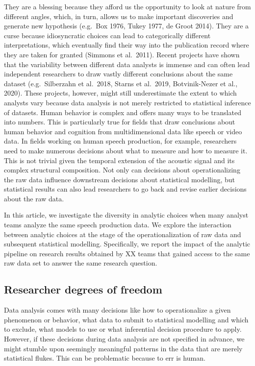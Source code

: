 \documentclass[
  english,
  man]{apa6}
\begin{document}
They are a blessing because they afford us the opportunity to look at nature from different angles, which, in turn, allows us to make important discoveries and generate new hypothesis (e.g.~Box 1976, Tukey 1977, de Groot 2014).
They are a curse because idiosyncratic choices can lead to categorically different interpretations, which eventually find their way into the publication record where they are taken for granted (Simmons et al.~2011).
Recent projects have shown that the variability between different data analysts is immense and can often lead independent researchers to draw vastly different conclusions about the same dataset (e.g.~Silberzahn et al.~2018, Starns et al.~2019, Botvinik-Nezer et al., 2020).
These projects, however, might still underestimate the extent to which analysts vary because data analysis is not merely restricted to statistical inference of datasets.
Human behavior is complex and offers many ways to be translated into numbers.
This is particularly true for fields that draw conclusions about human behavior and cognition from multidimensional data like speech or video data.
In fields working on human speech production, for example, researchers need to make numerous decisions about what to measure and how to measure it.
This is not trivial given the temporal extension of the acoustic signal and its complex structural composition.
Not only can decisions about operationalizing the raw data influence downstream decisions about statistical modelling, but statistical results can also lead researchers to go back and revise earlier decisions about the raw data.

In this article, we investigate the diversity in analytic choices when many analyst teams analyze the same speech production data.
We explore the interaction between analytic choices at the stage of the operationalization of raw data and subsequent statistical modelling.
Specifically, we report the impact of the analytic pipeline on research results obtained by XX teams that gained access to the same raw data set to answer the same research question.

\hypertarget{researcher-degrees-of-freedom}{%
\subsection{Researcher degrees of freedom}\label{researcher-degrees-of-freedom}}

Data analysis comes with many decisions like how to operationalize a given phenomenon or behavior, what data to submit to statistical modelling and which to exclude, what models to use or what inferential decision procedure to apply.
However, if these decisions during data analysis are not specified in advance, we might stumble upon seemingly meaningful patterns in the data that are merely statistical flukes.
This can be problematic because to err is human.
\end{document}

